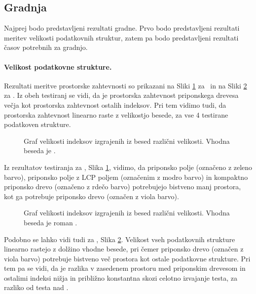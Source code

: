 \subsection{Gradnja}
Najprej bodo predstavljeni rezultati gradne. Prvo bodo predstavljeni rezultati meritev velikosti podatkovnih struktur, zatem pa bodo predstavljeni rezultati časov potrebnih za gradnjo.

\paragraph{Velikost podatkovne strukture.}

Rezultati meritve prostorske zahtevnosti so prikazani na Sliki \ref{fig:VelikostGraf} za \DNK\ in na Sliki \ref{fig:VelikostGrafSLO} za \NK. Iz obeh testiranj se vidi, da je prostorska zahtevnost priponskega drevesa večja kot prostorska zahtevnost ostalih indeksov. Pri tem vidimo tudi, da prostorska zahtevnost linearno raste z velikostjo besede, za vse 4 testirane podatkoven strukture.

\begin{figure}[htb]
    \centering
    
    \caption{Graf velikosti indeksov izgrajenih iz besed različni velikosti. Vhodna beseda je \DNK.} 
    \label{fig:VelikostGraf}
\end{figure}

Iz rezultatov testiranja za \DNK, Slika \ref{fig:VelikostGraf}, vidimo, da priponsko polje (označeno z zeleno barvo), priponsko polje z LCP poljem (označenim z modro barvo) in kompaktno priponsko drevo (označeno z rdečo barvo) potrebujejo bistveno manj prostora, kot ga potrebuje priponsko drevo (označen z viola barvo).

\begin{figure}[tb]
    \centering
    
    \caption{Graf velikosti indeksov izgrajenih iz besed različni velikosti. Vhodna beseda je roman \NK.} 
    \label{fig:VelikostGrafSLO}
\end{figure}

Podobno se lahko vidi tudi za \NK, Slika \ref{fig:VelikostGrafSLO}. Velikost vseh podatkovnih strukture linearno rastejo z dolžino vhodne besede, pri čemer priponsko drevo (označen z viola barvo) potrebuje bistveno več prostora kot ostale podatkovne strukture. Pri tem pa se vidi, da je razlika v zasedenem prostoru med priponskim drevesom in ostalimi indeksi nižja in približno konstantna skozi celotno izvajanje testa, za razliko od testa nad \DNK.


